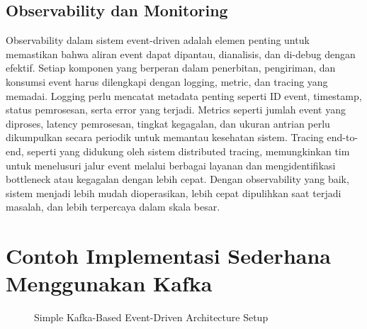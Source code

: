 \subsection{Observability dan Monitoring}
Observability dalam sistem event-driven adalah elemen penting untuk memastikan bahwa aliran event dapat dipantau, dianalisis, dan di-debug dengan efektif. Setiap komponen yang berperan dalam penerbitan, pengiriman, dan konsumsi event harus dilengkapi dengan logging, metric, dan tracing yang memadai. Logging perlu mencatat metadata penting seperti ID event, timestamp, status pemrosesan, serta error yang terjadi. Metrics seperti jumlah event yang diproses, latency pemrosesan, tingkat kegagalan, dan ukuran antrian perlu dikumpulkan secara periodik untuk memantau kesehatan sistem. Tracing end-to-end, seperti yang didukung oleh sistem distributed tracing, memungkinkan tim untuk menelusuri jalur event melalui berbagai layanan dan mengidentifikasi bottleneck atau kegagalan dengan lebih cepat. Dengan observability yang baik, sistem menjadi lebih mudah dioperasikan, lebih cepat dipulihkan saat terjadi masalah, dan lebih terpercaya dalam skala besar.



\section{Contoh Implementasi Sederhana Menggunakan Kafka}


\begin{figure}[h]
	\centering
	\caption{Simple Kafka-Based Event-Driven Architecture Setup}
	\label{fig:kafka-eda-setup}
\end{figure}



